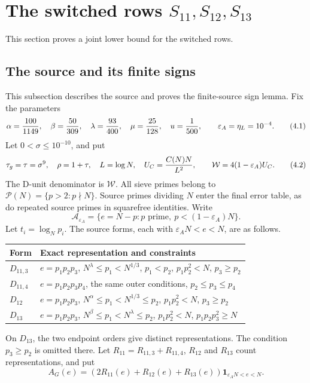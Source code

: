 \section{The switched rows $S_{11},S_{12},S_{13}$}

This section proves a joint lower bound for the switched rows.

\subsection{The source and its finite signs}

This subsection describes the source and proves the finite-source sign lemma.
Fix the parameters
\[
 \alpha={100\over1149},\quad\beta={50\over309},\quad
 \lambda={93\over400},\quad\mu={25\over128},\quad u={1\over500},
 \qquad \varepsilon_A=\eta_L=10^{-4}.
 \tag{4.1}
\]
Let $0<\sigma\le10^{-10}$, and put
\[
 \tau_g=\tau=\sigma^9,\quad \rho=1+\tau,\quad L=\log N,\quad
 U_C={C(N)N\over L^2},\qquad \mathcal W=4(1-\varepsilon_A)U_C.
 \tag{4.2}
\]
The D-unit denominator is $\mathcal W$.
All sieve primes belong to $\mathcal P(N)=\{p>2:p\nmid N\}$.
Source primes dividing $N$ enter the final error table,
as do repeated source primes in squarefree identities.
Write
\[
 \mathcal A_{\varepsilon_A}
 =\{e=N-p:p\text{ prime},\ p<(1-\varepsilon_A)N\}.
 \tag{4.3}
\]
Let $t_i=\log_Np_i$.
The source forms, each with $\varepsilon_A N<e<N$, are as follows.
\begingroup
\setlength{\tabcolsep}{3pt}
\begin{longtable}{@{}>{\raggedright\arraybackslash}p{}>{\raggedright\arraybackslash}p{}@{}}
\toprule
Form & Exact representation and constraints \\
\midrule
$D_{11,3}$ & $e=p_1p_2p_3$, $N^\lambda\le p_1<N^{1/3}$, $p_1<p_2$, $p_1p_2^2<N$, $p_3\ge p_2$ \\
$D_{11,4}$ & $e=p_1p_2p_3p_4$, the same outer conditions, $p_2\le p_3\le p_4$ \\
$D_{12}$ & $e=p_1p_2p_3$, $N^\alpha\le p_1<N^{1/3}\le p_2$, $p_1p_2^2<N$, $p_3\ge p_2$ \\
$D_{13}$ & $e=p_1p_2p_3$, $N^\beta\le p_1<N^\lambda\le p_2$, $p_1p_2^2<N$, $p_1p_2p_3^2\ge N$ \\
\bottomrule
\end{longtable}
\endgroup
On $D_{13}$, the two endpoint orders give distinct representations.
The condition $p_3\ge p_2$ is omitted there.
Let $R_{11}=R_{11,3}+R_{11,4}$, $R_{12}$ and $R_{13}$ count representations, and put
\[
 A_G(e)=(2R_{11}(e)+R_{12}(e)+R_{13}(e))
                  \mathbf1_{\varepsilon_A N<e<N}.
 \tag{4.4}
\]
